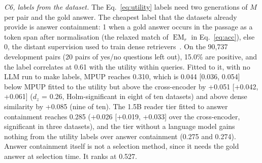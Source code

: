 \documentclass[conference]{IEEEtran}
\begin{document}
\begin{table}[htbp]
    \centering
    \caption{Cost tiers of MPUP (C3), 1,641 rankable test questions, Qwen2.5-7B utility. Runs: the models run per query at selection time ($M$: the target LLM; R: a small reader; CE: the cross-encoder). $\Delta$: difference to the cross-encoder with its 95\% bootstrap interval. Time: mean selection time per query and peak GPU memory, measured one query at a time on 100 test questions (17.2 candidates on average, bfloat16, E5 and the cross-encoder included).}
    \label{tab:tiers}
    \footnotesize
\end{table}

\textit{C6, labels from the dataset.} The Eq.~\eqref{eq:utility} labels need two generations of $M$ per pair and the gold answer. The cheapest label that the datasets already provide is answer containment: 1 when a gold answer occurs in the passage as a token span after normalisation (the relaxed match of $\operatorname{EM}_r$ in Eq.~\eqref{eq:acc}), else 0, the distant supervision used to train dense retrievers~\cite{karpukhin2020}. On the 90,737 development pairs (20 pairs of yes/no questions left out), 15.0\% are positive, and the label correlates at 0.61 with the utility within queries. Fitted to it, with no LLM run to make labels, MPUP reaches 0.310, which is 0.044 [0.036, 0.054] below MPUP fitted to the utility but above the cross-encoder by +0.051 [+0.042, +0.061] ($d_z$ = 0.26, Holm-significant in eight of ten datasets) and above dense similarity by +0.085 (nine of ten). The 1.5B reader tier fitted to answer containment reaches 0.285 (+0.026 [+0.019, +0.033] over the cross-encoder, significant in three datasets), and the tier without a language model gains nothing from the utility labels over answer containment (0.275 and 0.274). Answer containment itself is not a selection method, since it needs the gold answer at selection time. It ranks at 0.527.
\end{document}
